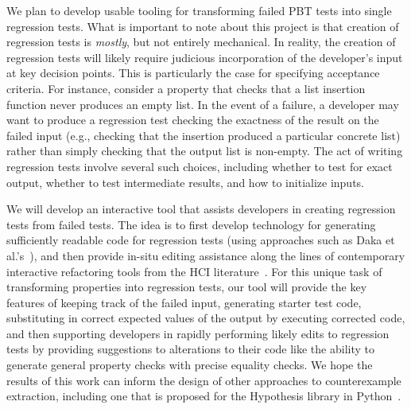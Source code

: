 We plan to develop usable tooling for transforming failed PBT tests into single
regression tests. What is important to note about this project is that creation
of regression tests is \emph{mostly}, but not entirely mechanical. In reality,
the creation of regression tests will likely require judicious incorporation of
the developer's input at key decision points. This is particularly the case for
specifying acceptance criteria. For instance, consider a property that checks
that a list insertion function never produces an empty list. In the event of a
failure, a developer may want to produce a regression test checking the
exactness of the result on the failed input (e.g., checking that the insertion
produced a particular concrete list) rather than simply checking that the output
list is non-empty. The act of writing regression tests involve several such
choices, including whether to test for exact output, whether to test
intermediate results, and how to initialize inputs.

We will develop an interactive tool that assists developers in creating
regression tests from failed tests. The idea is to first develop
technology for generating sufficiently readable code for regression tests (using
approaches such as Daka et al.'s~\cite{ref:daka2015modeling}), and then provide
in-situ editing assistance along the lines of contemporary interactive
refactoring tools from the HCI
literature~\cite{ref:head2018interactive,ref:barik2016quick,ref:murphyhill2008refactoring,ref:lee2013draganddrop}.
For this unique task of transforming properties into regression tests,
our tool will provide the key features of keeping track of the failed input,
generating starter test code, substituting in correct expected values of the
output by executing corrected code, and then supporting developers in rapidly
performing likely edits to regression tests by providing suggestions to
alterations to their code like the ability to generate general property checks
with precise equality checks. We hope the results of this work can inform the
design of other approaches to counterexample extraction, including one that is
proposed for the Hypothesis library in Python~\cite{maciver2019hypothesis}.


